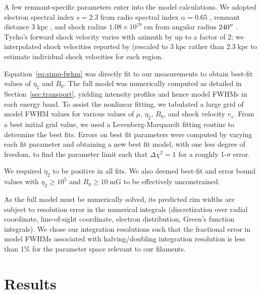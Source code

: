 \documentclass[iop, apj, numberedappendix, twocolappendix]{emulateapj}
\newcommand*{\mt}{\mathrm}
\newcommand*{\unit}[1]{\;\mt{#1}}  %
\begin{document}
A few remnant-specific parameters enter into the model calculations.  We
adopted electron spectral index $s = 2.3$ from radio spectral index $\alpha =
0.65$ \citep{kothes2006},
remnant distance $3 \unit{kpc}$ \citep[cf.][]{hayato2010}, and shock radius
$1.08 \times 10^{19} \unit{cm}$ from angular radius $240\mbox{$^{\prime\prime}$}$
\citep{green2009}.  Tycho's forward shock velocity varies with azimuth by up to
a factor of 2; we interpolated shock velocities reported by
\citet{williams2013} (rescaled to $3 \unit{kpc}$ rather than $2.3 \unit{kpc}$
to estimate individual shock velocities for each region.

Equation~\eqref{eq:simp-fwhm} was directly fit to our measurements to obtain
best-fit values of $\eta_2$ and $B_0$.  The full model was numerically computed
as detailed in Section~\ref{sec:transport}, yielding intensity profiles and
hence model FWHMs in each energy band.  To assist the nonlinear
fitting, we tabulated a large grid of model FWHM values for various values of
$\mu$, $\eta_2$, $B_0$, and shock velocity $v_s$.  From a best initial grid
value, we used a Levenberg-Marquardt fitting routine to determine the best
fits.  Errors on best fit parameters were computed by varying each fit
parameter and obtaining a new best fit model, with one less degree of freedom,
to find the parameter limit such that $\Delta \chi^2 = 1$ for a roughly
1-$\sigma$ error.

We required $\eta_2$ to be positive in all fits.  We also deemed
best-fit and error bound values with $\eta_2 \geq 10^5$ and $B_0 \geq 10
\unit{mG}$ to be effectively unconstrained. %

As the full model must be numerically solved, its predicted rim widths are
subject to resolution error in the numerical integrals (discretization over
radial coordinate, line-of-sight coordinate, electron distribution, Green's
function integrals).  We chose our integration resolutions such that the
fractional error in model FWHMs associated with halving/doubling integration
resolution is less than $1\%$ for the parameter space relevant to our
filaments.

\section{Results}
\end{document}
